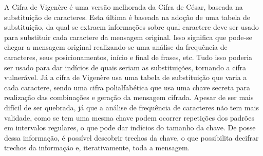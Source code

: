 \documentclass[12pt, a4paper]{article}
\begin{document}
A Cifra de Vigenère é uma versão melhorada da Cifra de César, baseada na substituição de caracteres. Esta última é baseada na
adoção de uma tabela de substituição, da qual se extraem informações sobre qual caractere deve ser usado para substituir cada
caractere da mensagem original. Isso significa que pode-se chegar a mensagem original realizando-se uma análise da frequência
de caracteres, seus posicionamentos, início e final de frases, etc. Tudo isso poderia ser usado para dar indícios de quais
seriam as substituições, tornando a cifra vulnerável. Já a cifra de Vigenère usa uma tabela de substituição que varia a cada
caractere, sendo uma cifra polialfabética que usa uma chave secreta para realização das combinações e geração da mensagem
cifrada. Apesar de ser mais difícil de ser quebrada, já que a análise de frequência de caracteres não tem mais validade, como
se tem uma mesma chave podem ocorrer repetições dos padrões em intervalos regulares, o que pode dar indícios do tamanho da
chave. De posse dessa informação, é possível descobrir trechos da chave, o que possibilita decifrar trechos da informação e,
iterativamente, toda a mensagem.
\end{document}
